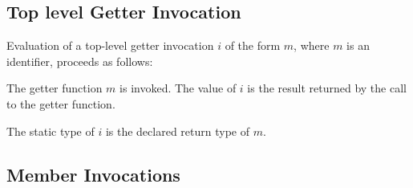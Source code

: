 \documentclass[makeidx]{article}
\begin{document}
{\subsection{Top level Getter Invocation}

\LMHash{}%
Evaluation of a top-level getter invocation $i$ of the form $m$,
where $m$ is an identifier,
proceeds as follows:

\LMHash{}%
The getter function $m$ is invoked.
The value of $i$ is the result returned by the call to the getter function.

\LMHash{}%
The static type of $i$ is the declared return type of $m$.


\subsection{Member Invocations}

}
\end{document}
